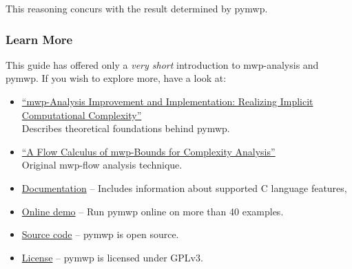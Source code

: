 This reasoning concurs with the result determined by pymwp.

\subsubsection{Learn More}\label{guide-learn-more}

This guide has offered only a \emph{very short} introduction to mwp-analysis and pymwp.
If you wish to explore more, have a look at:

\begin{itemize}

\item \href{https://doi.org/10.4230/LIPIcs.FSCD.2022.26}
{\enquote{mwp-Analysis Improvement and Implementation: Realizing Implicit Computational Complexity}}\\
Describes theoretical foundations behind pymwp.

\item \href{https://doi.org/10.1145/1555746.1555752}
{\enquote{A Flow Calculus of mwp-Bounds for Complexity Analysis}}\\
Original mwp-flow analysis technique.

\item \href{https://statycc.github.io/pymwp}{Documentation} -- Includes information about supported C language features, \etc

\item \href{https://statycc.github.io/pymwp/demo/}{Online demo} -- Run pymwp online on more than 40 examples.

\item \href{https://github.com/statycc/pymwp}{Source code} -- pymwp is open source.

\item \href{https://github.com/statycc/pymwp/blob/main/LICENSE}{License} -- pymwp is licensed under GPLv3.

\end{itemize}